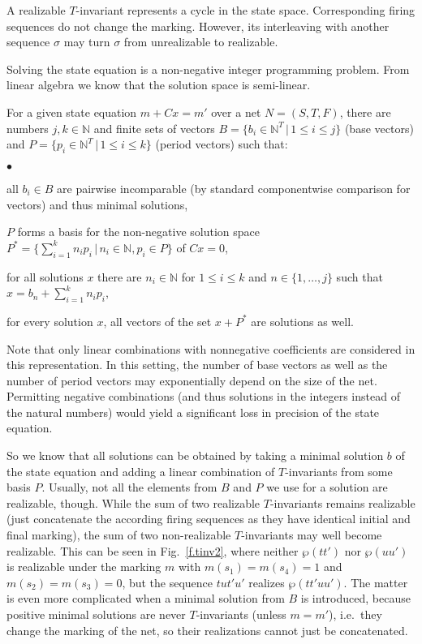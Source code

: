 \documentclass{LMCS}
\newcommand{\nat}{\mathbb{N}}
\newcommand{\parikh}{\wp}
\newcommand{\I}{C} \newcommand{\C}{{\ensuremath \Gamma}} \newcommand{\ord}{\ensuremath{\Omega}}
\begin{document}
A realizable $T$-invariant represents a cycle in the state space. Corresponding firing sequences do not change the marking. However, its interleaving with another sequence $\sigma$
may turn  $\sigma$ from unrealizable to realizable. 

Solving the state equation is a
non-negative integer programming problem. From linear algebra we know that the solution space is 
semi-linear.

\begin{cor}
For a given state equation $m+\I x=m'$ over a net $N=(S,T,F)$, there are numbers $j,k\in\nat$ and finite sets of vectors 
$B=\{b_i\in\nat^T\,|\,1\le i\le j\}$ (base vectors) and $P=\{p_i\in\nat^T\,|\,1\le i\le k\}$ (period vectors) such that:
\begin{iteMize}{$\bullet$}
\item all $b_i\in B$ are pairwise incomparable (by standard componentwise comparison for vectors) and thus minimal solutions,
\item $P$ forms a basis for the non-negative solution space $P^*=\{\sum_{i=1}^kn_ip_i\,|\,n_i\in\nat, p_i\in P\}$ of $\I x=0$,
\item for all solutions $x$ there are $n_i\in\nat$ for $1\le i\le k$ and $n\in\{1,\ldots,j\}$ such that
	$x = b_n+\sum_{i=1}^kn_ip_i$,
\item for every solution $x$, all vectors of the set $x+P^*$ are solutions as well.
\end{iteMize}
\end{cor}

Note that only linear combinations with nonnegative coefficients are considered in this representation.
In this setting, the number of base vectors as well as the number of period vectors may exponentially depend on the
size of the net. Permitting negative combinations (and thus solutions in the integers instead of the natural numbers)
would yield a significant loss in precision of the state equation.


So we know that all solutions can be obtained by taking a minimal solution $b$ of the state equation
and adding a linear combination of $T$-invariants from some basis $P$. Usually, not all the elements
from $B$ and $P$ we use for a solution are realizable, though. While the sum of two realizable $T$-invariants
remains realizable (just concatenate the according firing sequences as they have identical initial and final marking), 
the sum of two non-realizable
$T$-invariants may well become realizable. This can be seen in Fig.~\ref{f.tinv2}, where neither $\parikh(tt')$
nor $\parikh(uu')$ is realizable under the marking $m$ with $m(s_1)=m(s_4)=1$ and $m(s_2)=m(s_3)=0$, 
but the sequence $tut'u'$ realizes $\parikh(tt'uu')$. The matter is even more complicated when a minimal
solution from $B$ is introduced, because positive minimal solutions are never $T$-invariants (unless $m=m'$), i.e.\ 
they change the marking of the net, so their realizations cannot just be concatenated.
\end{document}
